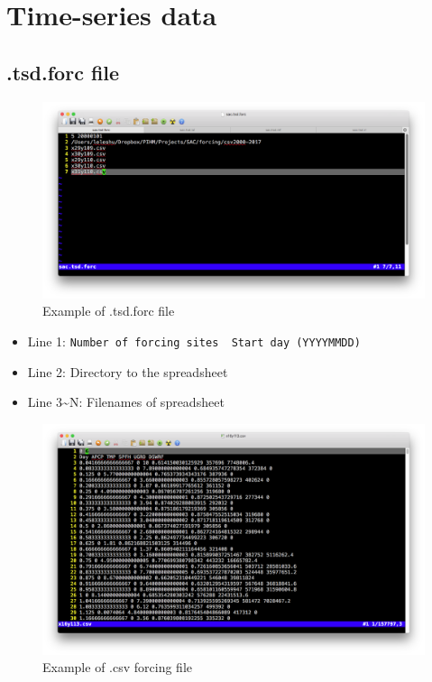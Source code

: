 \documentclass[]{scrbook}
\providecommand{\tightlist}{%
  \setlength{\itemsep}{0pt}\setlength{\parskip}{0pt}}
\begin{document}
\section{Time-series data}\label{time-series-data}

\subsection{.tsd.forc file}\label{tsd.forc-file}

\begin{figure}
\centering
\includegraphics{Fig/IO/tsd.forc.png}
\caption{Example of .tsd.forc file}
\end{figure}

\begin{itemize}
\tightlist
\item
  Line 1:
  \texttt{Number\ of\ forcing\ sites\ \textbar{}\ Start\ day\ (YYYYMMDD)}
\item
  Line 2: Directory to the spreadsheet
\item
  Line 3\textasciitilde{}N: Filenames of spreadsheet
\end{itemize}

\begin{figure}
\centering
\includegraphics{Fig/IO/tsd.csv.png}
\caption{Example of .csv forcing file}
\end{figure}
\end{document}
